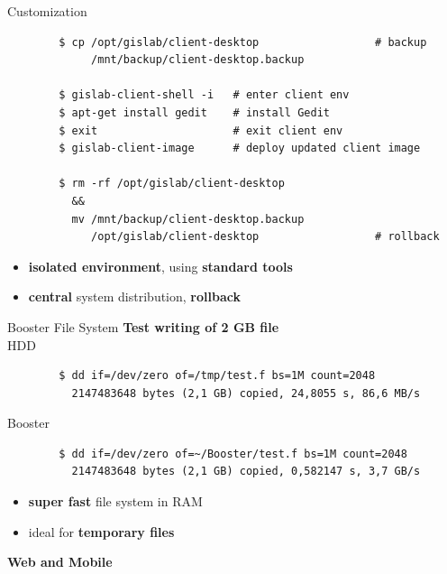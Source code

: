 \documentclass[12pt]{beamer}
\begin{document}
\begin{frame}[fragile]{Customization}
	\lstset{language=sh}
	\begin{lstlisting}
		$ cp /opt/gislab/client-desktop                  # backup
		     /mnt/backup/client-desktop.backup
		
		$ gislab-client-shell -i   # enter client env
		$ apt-get install gedit    # install Gedit
		$ exit                     # exit client env
		$ gislab-client-image      # deploy updated client image
		
		$ rm -rf /opt/gislab/client-desktop
		  &&
		  mv /mnt/backup/client-desktop.backup
		     /opt/gislab/client-desktop                  # rollback
	\end{lstlisting}

	\begin{itemize}
		\item \textbf{isolated environment}, using \textbf{standard tools}
		\item \textbf{central} system distribution, \textbf{rollback}
	\end{itemize}
\end{frame}

\begin{frame}[fragile]{Booster File System}
	\textbf{Test writing of 2 GB file}
	\\
	HDD
	\lstset{language=sh}
	\begin{lstlisting}
		$ dd if=/dev/zero of=/tmp/test.f bs=1M count=2048
		  2147483648 bytes (2,1 GB) copied, 24,8055 s, 86,6 MB/s
	\end{lstlisting}

	Booster
	\lstset{language=sh}
	\begin{lstlisting}
		$ dd if=/dev/zero of=~/Booster/test.f bs=1M count=2048
		  2147483648 bytes (2,1 GB) copied, 0,582147 s, 3,7 GB/s
	\end{lstlisting}

	\begin{itemize}
		\item \textbf{super fast} file system in RAM
		\item ideal for \textbf{temporary files}
	\end{itemize}
\end{frame}

\begin{frame}
	\begin{center}
		\LARGE\textbf{Web and Mobile}
	\end{center}
\end{frame}
\end{document}
